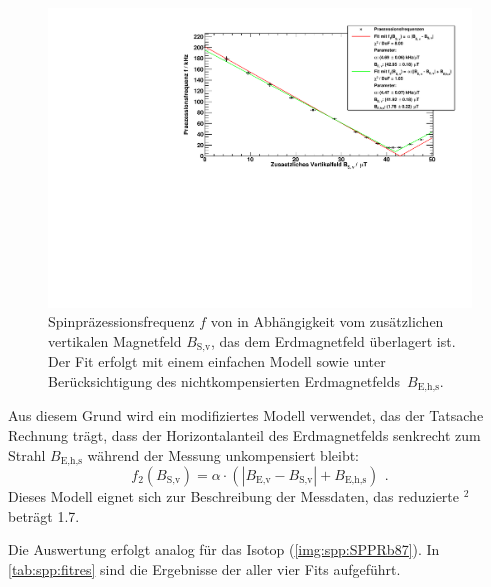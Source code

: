 \begin{figure}[H]
\begin{center}
  \includegraphics[width=\textwidth]{../img/part4/Rb85.pdf}
  \caption{Spinpräzessionsfrequenz $f$ von  in Abhängigkeit
  vom zusätzlichen vertikalen Magnetfeld $B_\text{S,v}$, das dem Erdmagnetfeld überlagert ist.
  Der Fit erfolgt mit einem einfachen Modell sowie unter Berücksichtigung des
  nichtkompensierten Erdmagnetfelds~$B_\text{E,h,s}$.}
  \label{img:spp:SPPRb85}
\end{center}
\end{figure} 

Aus diesem Grund wird ein modifiziertes Modell verwendet, das der Tatsache Rechnung trägt,
dass der Horizontalanteil des Erdmagnetfelds senkrecht zum Strahl $B_\text{E,h,s}$
während der Messung unkompensiert bleibt:
\begin{equation}
  f_2(B_\text{S,v})=\alpha \cdot (|B_\text{E,v}-B_\text{S,v}| + B_\text{E,h,s}) \ \, .
\end{equation}
Dieses Modell eignet sich zur Beschreibung der Messdaten, das reduzierte \textchi$^2$ beträgt 1.7.

Die Auswertung erfolgt analog für das Isotop  (\autoref{img:spp:SPPRb87}).
In \autoref{tab:spp:fitres} sind die Ergebnisse der aller vier Fits aufgeführt.

